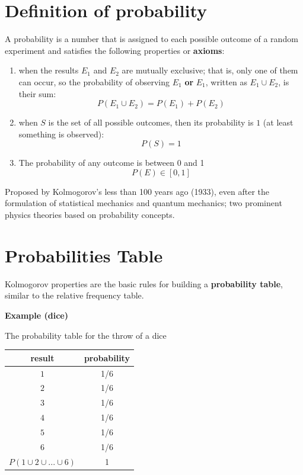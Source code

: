 \documentclass[
]{book}
\providecommand{\tightlist}{%
  \setlength{\itemsep}{0pt}\setlength{\parskip}{0pt}}
\begin{document}
\hypertarget{definition-of-probability}{%
\section{Definition of probability}\label{definition-of-probability}}

A probability is a number that is assigned to each possible outcome of a random experiment and satisfies the following properties or \textbf{axioms}:

\begin{enumerate}
\def\labelenumi{\arabic{enumi})}
\tightlist
\item
  when the results \(E_1\) and \(E_2\) are mutually exclusive; that is, only one of them can occur, so the probability of observing \(E_1\) \textbf{or} \(E_1\), written as \(E_1\cup E_2\), is their sum:
  \[ P( E_1\cup E_2) = P(E_1) + P(E_2)\]
\item
  when \(S\) is the set of all possible outcomes, then its probability is \(1\) (at least something is observed): \[P(S)=1\]
\item
  The probability of any outcome is between 0 and 1 \[P(E) \in [0,1]\]
\end{enumerate}

Proposed by Kolmogorov's less than 100 years ago (1933), even after the formulation of statistical mechanics and quantum mechanics; two prominent physics theories based on probability concepts.

\hypertarget{probabilities-table}{%
\section{Probabilities Table}\label{probabilities-table}}

Kolmogorov properties are the basic rules for building a \textbf{probability table}, similar to the relative frequency table.

\textbf{Example (dice)}

The probability table for the throw of a dice

\begin{longtable}[]{@{}cc@{}}
\toprule\noalign{}
result & probability \\
\midrule\noalign{}
\endhead
\bottomrule\noalign{}
\endlastfoot
\(1\) & 1/6 \\
\(2\) & 1/6 \\
\(3\) & 1/6 \\
\(4\) & 1/6 \\
\(5\) & 1/6 \\
\(6\) & 1/6 \\
\(P( 1 \cup 2\cup ... \cup 6)\) & 1 \\
\end{longtable}
\end{document}
